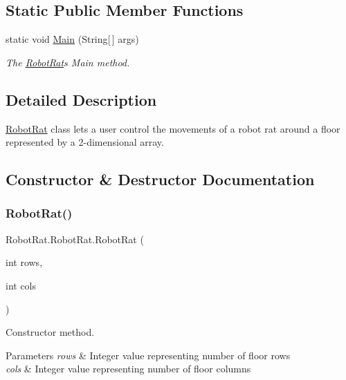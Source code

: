 \subsection*{Static Public Member Functions}
\begin{DoxyCompactItemize}
\item 
static void \hyperlink{class_robot_rat_1_1_robot_rat_a275ddc810b3c5f0b6b8200c35afd7f11}{Main} (String\mbox{[}$\,$\mbox{]} args)
\begin{DoxyCompactList}\small\item\em The \hyperlink{class_robot_rat_1_1_robot_rat}{Robot\+Rat}\textquotesingle{}s Main method. \end{DoxyCompactList}\end{DoxyCompactItemize}


\subsection{Detailed Description}
\hyperlink{class_robot_rat_1_1_robot_rat}{Robot\+Rat} class lets a user control the movements of a robot rat around a floor represented by a 2-\/dimensional array. 



\subsection{Constructor \& Destructor Documentation}
\mbox{\label{class_robot_rat_1_1_robot_rat_a8b4d65268fabd396c4219ca433ab81ea}} 
\subsubsection{\texorpdfstring{Robot\+Rat()}{RobotRat()}}
{\footnotesize\ttfamily Robot\+Rat.\+Robot\+Rat.\+Robot\+Rat (\begin{DoxyParamCaption}\item[{int}]{rows,  }\item[{int}]{cols }\end{DoxyParamCaption})}



Constructor method. 


\begin{DoxyParams}{Parameters}
{\em rows} & Integer value representing number of floor rows\\
\hline
{\em cols} & Integer value representing number of floor columns\\
\hline
\end{DoxyParams}


